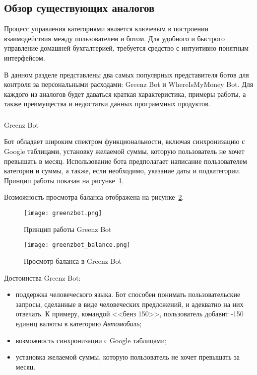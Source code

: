 \subsection{Обзор существующих аналогов}
\label{sec:analysis:analogues}

Процесс управления категориями является ключевым в построении взаимодействия между пользователем и ботом. Для удобного и быстрого управление домашней бухгалтерией, требуется средство с интуитивно понятным интерфейсом.

В данном разделе представлены два самых популярных представителя ботов для контроля за персональными расходами: Greenz Bot и \linebreak WhereIsMyMoney Bot. Для каждого из аналогов будет даваться краткая характеристика, примеры работы, а также преимущества и недостатки данных программных продуктов.

\vskip 0.7in
\subsubsection{} Greenz Bot
\label{sec:analysis:analogues:greenz}

Бот обладает широким спектром функциональности, включая синхронизацию с Google таблицами, установку желаемой суммы, которую пользователь не хочет превышать в месяц. Использование бота предполагает написание пользователем категории и суммы, а также, если необходимо, указание даты и подкатегории. Принцип работы показан на рисунке~\ref{fig:analysis:analogues:greenz}.

Возможность просмотра баланса отображена на рисунке~\ref{fig:analysis:analogues:greenz_balance}.

\begin{figure}
	\centering
	\texttt{[image: greenzbot.png]} 
	\caption{Принцип работы Greenz Bot}
	\label{fig:analysis:analogues:greenz}
\end{figure}

\begin{figure}
	\centering
	\texttt{[image: greenzbot\_balance.png]} 
	\caption{Просмотр баланса в Greenz Bot}
	\label{fig:analysis:analogues:greenz_balance}
\end{figure}

Достоинства Greenz Bot:

\begin{itemize}
	\item поддержка человеческого языка. Бот способен понимать пользовательские запросы, сделанные в виде человеческих предложений, и адекватно на них отвечать. К примеру, командой <<бенз 150>>, пользователь добавит -150 единиц валюты в категорию \emph{Автомобиль};
	\item возможность синхронизации с Google таблицами;
	\item установка желаемой суммы, которую пользователь не хочет превышать за месяц.
\end{itemize}

